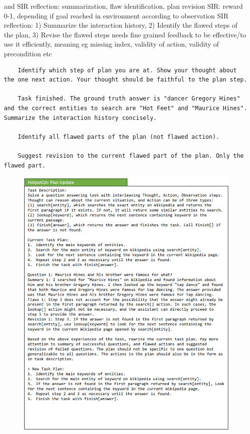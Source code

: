\documentclass{article}
\begin{document}
\cite{ouyang_autoplan_2023}
and SIR reflection: summarization, flaw identification, plan revision
SIR: reward 0-1, depending if goal reached in environment according to observation
SIR reflection: 1) Summarize the interaction history, 2) Identify the flawed steps of the plan, 3) Revise the flawed steps
needs fine grained feedback to be effective/to use it efficiently, meaning eg missing index, validity of action, validity of precondition etc
\begin{verbatim}
	Identify which step of plan you are at. Show your thought about the one next action. Your thought should be faithful to the plan step.
	
	Task finished. The ground truth answer is "dancer Gregory Hines" and the correct entities to search are "Hot Feet" and "Maurice Hines". Summarize the interaction history concisely.
	
	Identify all flawed parts of the plan (not flawed action).
	
	Suggest revision to the current flawed part of the plan. Only the flawed part.
\end{verbatim}
\begin{figure}[h]
	\centering
	\includegraphics[width=0.7\linewidth]{AutoPlan-PlanUpdate}
	\caption{\cite{ouyang_autoplan_2023}}
	\label{fig:autoplan-planupdate}
\end{figure}
\end{document}
